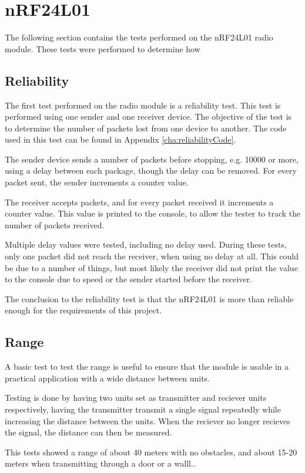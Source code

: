 \section{nRF24L01}
The following section contains the tests performed on the nRF24L01 radio module. These tests were performed to determine how 

\subsection{Reliability}
The first test performed on the radio module is a reliability test. This test is performed using one sender and one receiver device. The objective of the test is to determine the number of packets lost from one device to another. 
The code used in this test can be found in Appendix \ref{cha:reliabilityCode}.


The sender device sends a number of packets before stopping, e.g. 10000 or more, using a delay between each package, though the delay can be removed. For every packet sent, the sender increments a counter value.

The receiver accepts packets, and for every packet received it increments a counter value. This value is printed to the console, to allow the tester to track the number of packets received.

Multiple delay values were tested, including no delay used. During these tests, only one packet did not reach the receiver, when using no delay at all. This could be due to a number of things, but most likely the receiver did not print the value to the console due to speed or the sender started before the receiver.

The conclusion to the reliability test is that the nRF24L01 is more than reliable enough for the requirements of this project.

\subsection{Range}
A basic test to test the range is useful to ensure that the module is usable in a practical application with a wide distance between units.

Testing is done by having two units set as transmitter and reciever units respectively, having the transmitter transmit a single signal repeatedly while increasing the distance between the units. When the reciever no longer recieves the signal, the distance can then be measured.

This tests showed a range of about 40 meters with no obstacles, and about 15-20 meters when transmitting through a door or a walll..

